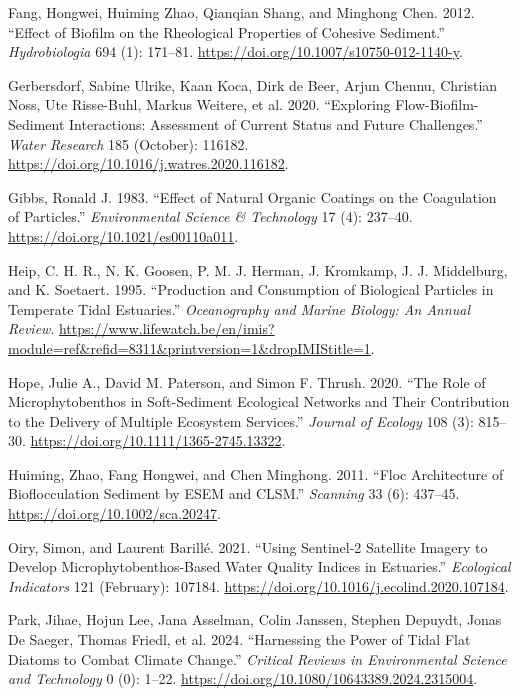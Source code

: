 \documentclass[
  letterpaper,
  DIV=11,
  numbers=noendperiod]{scrartcl}
\newlength{\cslhangindent}
\newenvironment{CSLReferences}[2] %
 {\begin{list}{}{%
  \setlength{\itemindent}{0pt}
  \setlength{\leftmargin}{0pt}
  \setlength{\parsep}{0pt}
  \ifodd #1
   \setlength{\leftmargin}{\cslhangindent}
   \setlength{\itemindent}{-1\cslhangindent}
  \fi
  \setlength{\itemsep}{#2\baselineskip}}}
 {\end{list}}
\begin{document}
\label{refs}
\begin{CSLReferences}{1}{0}
Fang, Hongwei, Huiming Zhao, Qianqian Shang, and Minghong Chen. 2012.
{``Effect of Biofilm on the Rheological Properties of Cohesive
Sediment.''} \emph{Hydrobiologia} 694 (1): 171--81.
\url{https://doi.org/10.1007/s10750-012-1140-y}.

Gerbersdorf, Sabine Ulrike, Kaan Koca, Dirk de Beer, Arjun Chennu,
Christian Noss, Ute Risse-Buhl, Markus Weitere, et al. 2020.
{``Exploring Flow-Biofilm-Sediment Interactions: {Assessment} of Current
Status and Future Challenges.''} \emph{Water Research} 185 (October):
116182. \url{https://doi.org/10.1016/j.watres.2020.116182}.

Gibbs, Ronald J. 1983. {``Effect of Natural Organic Coatings on the
Coagulation of Particles.''} \emph{Environmental Science \& Technology}
17 (4): 237--40. \url{https://doi.org/10.1021/es00110a011}.

Heip, C. H. R., N. K. Goosen, P. M. J. Herman, J. Kromkamp, J. J.
Middelburg, and K. Soetaert. 1995. {``Production and Consumption of
Biological Particles in Temperate Tidal Estuaries.''} \emph{Oceanography
and Marine Biology: An Annual Review}.
\url{https://www.lifewatch.be/en/imis?module=ref&refid=8311&printversion=1&dropIMIStitle=1}.

Hope, Julie A., David M. Paterson, and Simon F. Thrush. 2020. {``The
Role of Microphytobenthos in Soft-Sediment Ecological Networks and Their
Contribution to the Delivery of Multiple Ecosystem Services.''}
\emph{Journal of Ecology} 108 (3): 815--30.
\url{https://doi.org/10.1111/1365-2745.13322}.

Huiming, Zhao, Fang Hongwei, and Chen Minghong. 2011. {``Floc
Architecture of Bioflocculation Sediment by {ESEM} and {CLSM}.''}
\emph{Scanning} 33 (6): 437--45.
\url{https://doi.org/10.1002/sca.20247}.

Oiry, Simon, and Laurent Barillé. 2021. {``Using Sentinel-2 Satellite
Imagery to Develop Microphytobenthos-Based Water Quality Indices in
Estuaries.''} \emph{Ecological Indicators} 121 (February): 107184.
\url{https://doi.org/10.1016/j.ecolind.2020.107184}.

Park, Jihae, Hojun Lee, Jana Asselman, Colin Janssen, Stephen Depuydt,
Jonas De Saeger, Thomas Friedl, et al. 2024. {``Harnessing the Power of
Tidal Flat Diatoms to Combat Climate Change.''} \emph{Critical Reviews
in Environmental Science and Technology} 0 (0): 1--22.
\url{https://doi.org/10.1080/10643389.2024.2315004}.


\end{CSLReferences}
\end{document}
